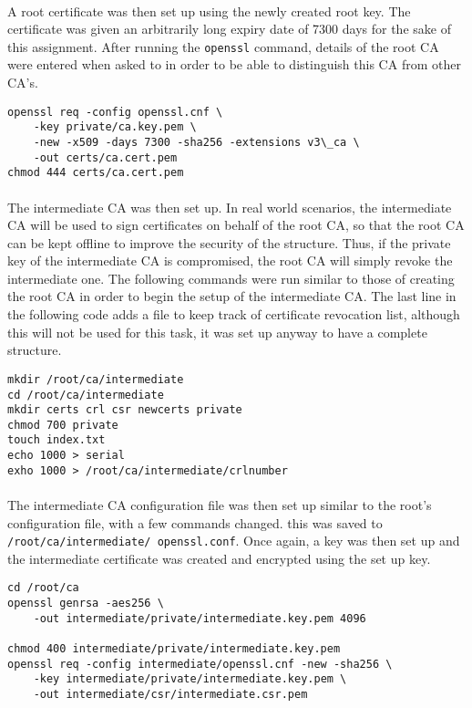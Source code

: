\paragraph{ }A root certificate was then set up using the newly created root key. The certificate was given an arbitrarily long expiry date of 7300 days for the sake of this assignment. After running the \texttt{openssl} command, details of the root CA were entered when asked to in order to be able to distinguish this CA from other CA's.
\begin{verbatim}
openssl req -config openssl.cnf \
    -key private/ca.key.pem \
    -new -x509 -days 7300 -sha256 -extensions v3\_ca \
    -out certs/ca.cert.pem
chmod 444 certs/ca.cert.pem
\end{verbatim}

\paragraph{ }The intermediate CA was then set up. In real world scenarios, the intermediate CA will be used to sign certificates on behalf of the root CA, so that the root CA can be kept  offline to improve the security of the structure. Thus, if the private key of the intermediate CA is compromised, the root CA will simply revoke the intermediate one. The following commands were run similar to those of creating the root CA in order to begin the setup of the intermediate CA. The last line in the following code adds a file to keep track of certificate revocation list, although this will not be used for this task, it was set up anyway to have a complete structure.
\begin{verbatim}
mkdir /root/ca/intermediate
cd /root/ca/intermediate
mkdir certs crl csr newcerts private
chmod 700 private
touch index.txt
echo 1000 > serial
exho 1000 > /root/ca/intermediate/crlnumber
\end{verbatim}

\paragraph{ }The intermediate CA configuration file was then set up similar to the root's configuration file, with a few commands changed. this was saved to \texttt{/root/ca/intermediate/ openssl.conf}. Once again, a key was then set up and the intermediate certificate was created and encrypted using the set up key.

\begin{verbatim}
cd /root/ca
openssl genrsa -aes256 \
    -out intermediate/private/intermediate.key.pem 4096

chmod 400 intermediate/private/intermediate.key.pem
openssl req -config intermediate/openssl.cnf -new -sha256 \
    -key intermediate/private/intermediate.key.pem \
    -out intermediate/csr/intermediate.csr.pem
\end{verbatim}
